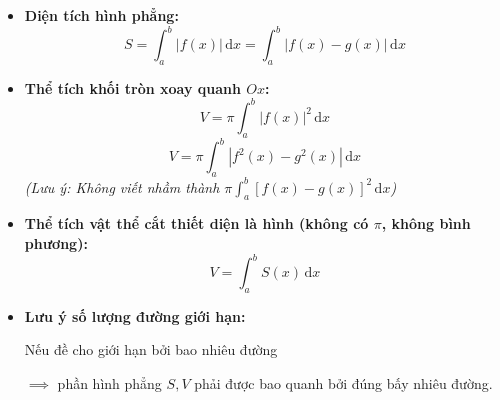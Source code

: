 \documentclass[12pt,a4paper]{article}
\begin{document}
\drawdashlinesfull

\drawdashlinesfull

\drawdashlinesfull

\drawdashlinesfull

\drawdashlinesfull


\begin{theorybox}
\begin{itemize}
    \item \textbf{Diện tích hình phẳng:}
    $$S = \int_a^b |f(x)|\,\mathrm{d}x = \int_a^b |f(x) - g(x)|\,\mathrm{d}x$$
    \item \textbf{Thể tích khối tròn xoay quanh $Ox$:}
    $$V = \pi \int_a^b |f(x)|^2\,\mathrm{d}x$$
    $$V = \pi \int_a^b |f^2(x) - g^2(x)|\,\mathrm{d}x$$
    \textit{(Lưu ý: Không viết nhầm thành $\pi \int_a^b [f(x) - g(x)]^2\,\mathrm{d}x$)}
    \item \textbf{Thể tích vật thể cắt thiết diện là hình (không có $\pi$, không bình phương):}
    $$V = \int_a^b S(x)\,\mathrm{d}x$$
    \item \textbf{Lưu ý số lượng đường giới hạn:}
    \par Nếu đề cho giới hạn bởi bao nhiêu đường 
    \par $\implies$ phần hình phẳng $S, V$ phải được bao quanh bởi đúng bấy nhiêu đường.
\end{itemize}
\end{theorybox}

\newpage
{}
\end{document}
